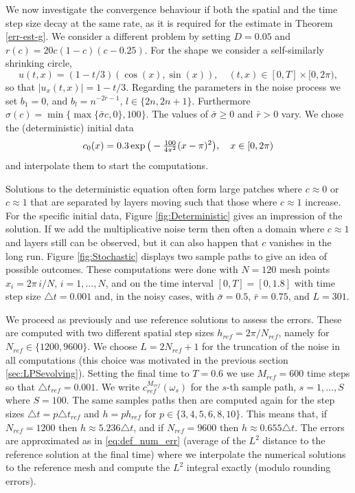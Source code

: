 \documentclass[a4paper,10pt]{article}
\numberwithin{equation}{section}
\begin{document}
We now investigate the convergence behaviour if both the spatial and the time step size decay at the same rate, as it is required for the estimate in Theorem \ref{err-est-g}. We consider a different problem by setting $D = 0.05$ and $r(c) = 20 c(1-c)(c-0.25)$.
For the shape we consider a self-similarly shrinking circle,
\[ 
u(t,x) = (1-t/3) (\cos(x),\sin(x)), \quad (t,x) \in [0,T] \times [0,2\pi),
\] 
so that $|u_x(t,x)| = 1-t/3$.
Regarding the parameters in the noise process we set $b_{1} = 0$, and $b_{l} = n^{-2\bar{r}-1}$, $l \in \{ 2n, 2n+1 \}$. Furthermore $\sigma(c) = \min \{ \max \{ \bar{\sigma} c, 0 \}, 100 \}$. The values of $\bar{\sigma} \geq 0$ and $\bar{r} > 0$ vary.
We chose the (deterministic) initial data
\[
 c_{0}(x) = 0.3 \exp \big{(} - \tfrac{100}{4 \pi^2} (x-\pi)^2 \big{)}, \quad x \in [0,2\pi)
\]
and interpolate them to start the computations.

Solutions to the deterministic equation often form large patches where $c \approx 0$ or $c \approx 1$ that are separated by layers moving such that those where $c \approx 1$ increase. For the specific initial data, Figure \ref{fig:Deterministic} gives an impression of the solution. If we add the multiplicative noise term then often a domain where $c \approx 1$ and layers still can be observed, but it can also happen that $c$ vanishes in the long run. Figure \ref{fig:Stochastic} displays two sample paths to give an idea of possible outcomes. These computations were done with $N = 120$ mesh points $x_i = 2 \pi \, i/N$, $i=1,\dots,N$,
and on the time interval $[0,T] = [0,1.8]$ with time step size $\triangle t = 0.001$ and, in the noisy cases, with $\bar{\sigma} = 0.5$, $\bar{r} = 0.75$, and $L = 301$.


We proceed as previously and use reference solutions to assess the errors. These are computed with two different spatial step sizes $h_{ref} = 2 \pi / N_{ref}$, namely for $N_{ref} \in \{ 1200, 9600 \}$. We choose $L = 2N_{ref}+1$ for the truncation of the noise in all computations (this choice was motivated in the previous section \ref{sec:LPSevolving}). Setting the final time to $T = 0.6$ we use $M_{ref} = 600$ time steps so that $\triangle t_{ref} = 0.001$. We write $c_{ref}^{M_{ref}}(\omega_s)$ for the $s$-th sample path, $s = 1, \dots, S$ where $S = 100$. The same samples paths then are computed again for the step sizes $\triangle t = p \triangle t_{ref}$ and $h = p h_{ref}$ for $p \in \{ 3, 4, 5, 6, 8, 10 \}$. This means that, if $N_{ref} = 1200$ then $h \approx 5.236 \triangle t$, and if $N_{ref} = 9600$ then $h \approx 0.655 \triangle t$. The errors are approximated as in \eqref{eq:def_num_err} (average of the $L^2$ distance to the reference solution at the final time) where we interpolate the numerical solutions to the reference mesh and compute the $L^2$ integral exactly (modulo rounding errors).
\end{document}
